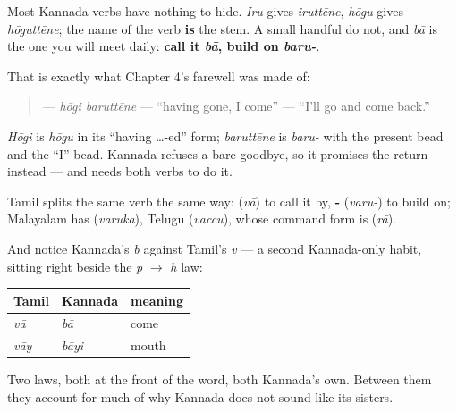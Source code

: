 \begin{grammarlens}[title={Grammar Lens: two shapes, one verb}]
Most Kannada verbs have nothing to hide. \emph{Iru} gives \emph{iruttēne}, \emph{hōgu} gives \emph{hōguttēne}; the name of the verb \textbf{is} the stem. A small handful do not, and \emph{bā} is the one you will meet daily: \textbf{call it \emph{bā}, build on \emph{baru-}}.

That is exactly what Chapter 4's farewell was made of:

\begin{quote}
\textbf{ } — \emph{hōgi baruttēne} — \textquotedblleft{}having gone, I come\textquotedblright{} — \textquotedblleft{}I'll go and come back.\textquotedblright{}
\end{quote}

\emph{Hōgi} is \emph{hōgu} in its \textquotedblleft{}having …-ed\textquotedblright{} form; \emph{baruttēne} is \emph{baru-} with the present bead and the \textquotedblleft{}I\textquotedblright{} bead. Kannada refuses a bare goodbye, so it promises the return instead — and needs both verbs to do it.

Tamil splits the same verb the same way: \textbf{} (\emph{vā}) to call it by, \textbf{-} (\emph{varu-}) to build on; Malayalam has \textbf{} (\emph{varuka}), Telugu \textbf{} (\emph{vaccu}), whose command form is \textbf{} (\emph{rā}).

And notice Kannada's \emph{b} against Tamil's \emph{v} — a second Kannada-only habit, sitting right beside the \emph{p} $\to$ \emph{h} law:

\noindent
\begin{tabularx}{\linewidth}{@{}>{\raggedright\arraybackslash}X>{\raggedright\arraybackslash}X>{\raggedright\arraybackslash}X@{}}
\toprule
\textbf{Tamil} & \textbf{Kannada} & \textbf{meaning} \\
\midrule
\emph{vā} & \emph{bā} & come \\
\emph{vāy} & \emph{bāyi} & mouth \\
\bottomrule
\end{tabularx}

Two laws, both at the front of the word, both Kannada's own. Between them they account for much of why Kannada does not sound like its sisters.
\end{grammarlens}

